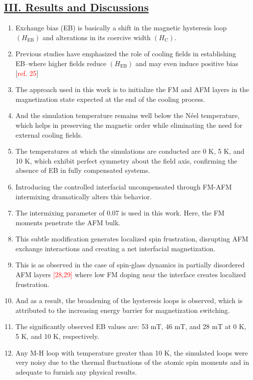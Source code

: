 \subsection*{\underline{III. Results and Discussions}}
\begin{enumerate}
    \item Exchange bias (EB) is basically a shift in the magnetic hysteresis loop $(H_{\mathrm{EB}})$ and alterations in its coercive width $(H_{\mathrm{C}})$.
    \item Previous studies have emphasized the role of cooling fields in establishing EB--where higher fields reduce $(H_{\mathrm{EB}})$ and may even induce positive bias [\textcolor{red}{ref. 25}]
    \item The approach used in this work is to initialize the FM and AFM layers in the magnetization state expected at the end of the cooling process.
    \item And the simulation temperature remains well below the N\'eel temperature, which helps in preserving the magnetic order while eliminating the need for external cooling fields.    
    \item The temperatures at which the simulations are conducted are 0 K, 5 K, and 10 K, which exhibit perfect symmetry about the field axis, confirming the absence of EB in fully compensated systems.
    \item Introducing the controlled interfacial uncompensated through FM-AFM intermixing dramatically alters this behavior.
    \item The intermixing parameter of 0.07 is used in this work. Here, the FM moments penetrate the AFM bulk.
    \item This subtle modification generates localized spin frustration, disrupting AFM exchange interactions and creating a net interfacial magnetization.
    \item This is as observed in the case of spin-glass dynamics in partially disordered AFM layers \textcolor{red}{[28,29]} where low FM doping near the interface creates localized frustration.
    \item And as a result, the broadening of the hysteresis loops is observed, which is attributed to the increasing energy barrier for magnetization switching.
    \item The significantly observed EB values are: 53 mT, 46 mT, and 28 mT at 0 K, 5 K, and 10 K, respectively.
    \item Any M-H loop with temperature greater than 10 K, the simulated loops were very noisy due to the thermal fluctuations of the atomic spin moments and in adequate to furnish any physical results.

\end{enumerate}
